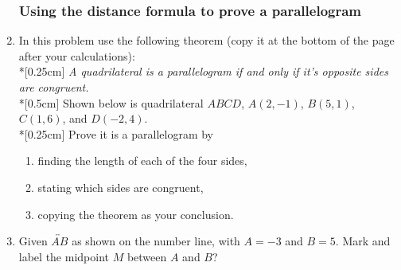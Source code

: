 \documentclass[12pt, twoside]{article}
\begin{document}
\begin{enumerate}
  \subsubsection*{Using the distance formula to prove a parallelogram}
\item In this problem use the following theorem (copy it at the bottom of the page after your calculations): \\*[0.25cm]
    \emph{A quadrilateral is a parallelogram if and only if it's opposite sides are congruent.}\\*[0.5cm]
    Shown below is quadrilateral $ABCD$, $A(2,-1)$, $B(5,1)$, $C(1,6)$, and $D(-2,4)$. \\*[0.25cm]
    Prove it is a parallelogram by
    \begin{enumerate}
      \item finding the length of each of the four sides,
      \item stating which sides are congruent,
      \item copying the theorem as your conclusion.
    \end{enumerate}
    \begin{flushright} %
    \end{flushright}

    \newpage
\item Given $\overleftrightarrow{AB}$ as shown on the number line, with $A=-3$ and $B=5$. Mark and label the midpoint $M$ between $A$ and $B$?\\[20pt] %
      

\end{enumerate}
\end{document}
